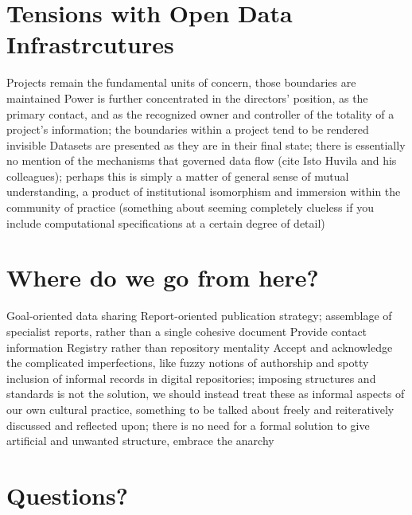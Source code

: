 \documentclass{article}
\begin{document}
\section{Tensions with Open Data Infrastrcutures}
Projects remain the fundamental units of concern, those boundaries are maintained
Power is further concentrated in the directors' position, as the primary contact, and as the recognized owner and controller of the totality of a project's information; the boundaries within a project tend to be rendered invisible
Datasets are presented as they are in their final state; there is essentially no mention of the mechanisms that governed data flow (cite Isto Huvila and his colleagues); perhaps this is simply a matter of general sense of mutual understanding, a product of institutional isomorphism and immersion within the community of practice (something about seeming completely clueless if you include computational specifications at a certain degree of detail)

\section{Where do we go from here?}
Goal-oriented data sharing
Report-oriented publication strategy; assemblage of specialist reports, rather than a single cohesive document
Provide contact information
Registry rather than repository mentality
Accept and acknowledge the complicated imperfections, like fuzzy notions of authorship and spotty inclusion of informal records in digital repositories; imposing structures and standards is not the solution, we should instead treat these as informal aspects of our own cultural practice, something to be talked about freely and reiteratively discussed and reflected upon; there is no need for a formal solution to give artificial and unwanted structure, embrace the anarchy

\section{Questions?}
\end{document}
